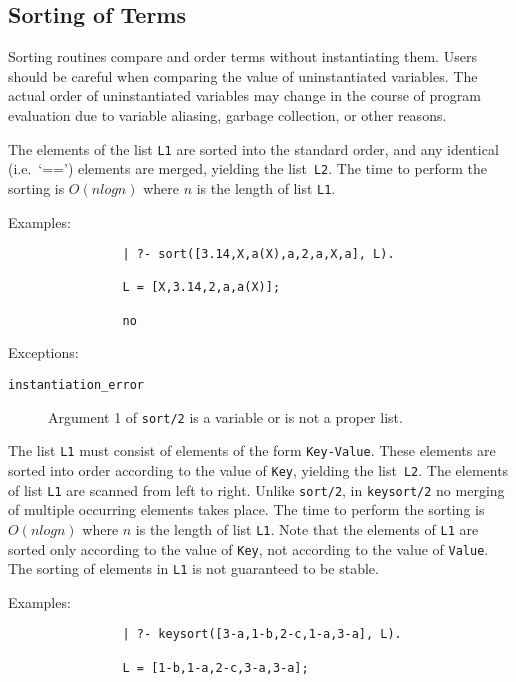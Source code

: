 \subsection{Sorting of Terms}

Sorting routines compare and order terms without instantiating them.
Users should be careful when comparing the value of uninstantiated
variables.  The actual order of uninstantiated variables may change in
the course of program evaluation due to variable aliasing, garbage
collection, or other reasons.

\begin{description}
    The elements of the list {\tt L1} are sorted into the standard order,
    and any identical (i.e.\ `==') elements are merged, yielding the 
    list~{\tt L2}.  The time to perform the sorting is $O(n log n)$ where 
    $n$ is the length of list {\tt L1}.  

    Examples:
    {\footnotesize
     \begin{verbatim}
                | ?- sort([3.14,X,a(X),a,2,a,X,a], L).

                L = [X,3.14,2,a,a(X)];

                no
     \end{verbatim}}
    Exceptions:
    \begin{description}
    \item[{\tt instantiation\_error}]
	Argument 1 of {\tt sort/2} is a variable or is not a proper list.
    \end{description}

    The list {\tt L1} must consist of elements of the form \verb'Key-Value'.
    These elements are sorted into order according to the value of {\tt Key},
    yielding the list~{\tt L2}.  The elements of list {\tt L1} are scanned
    from left to right.  Unlike {\tt sort/2}, in {\tt keysort/2} no
    merging of multiple occurring elements takes place.  The time to perform
    the sorting is $O(n log n)$ where $n$ is the length of list {\tt L1}.  
    Note that the elements of {\tt L1} are sorted only according to the
    value of {\tt Key}, not according to the value of {\tt Value}.  The 
    sorting of elements in {\tt L1} is not guaranteed to be stable.

    Examples:
    {\footnotesize
     \begin{verbatim}
                | ?- keysort([3-a,1-b,2-c,1-a,3-a], L).

                L = [1-b,1-a,2-c,3-a,3-a];


\end{verbatim}}
\end{description}
